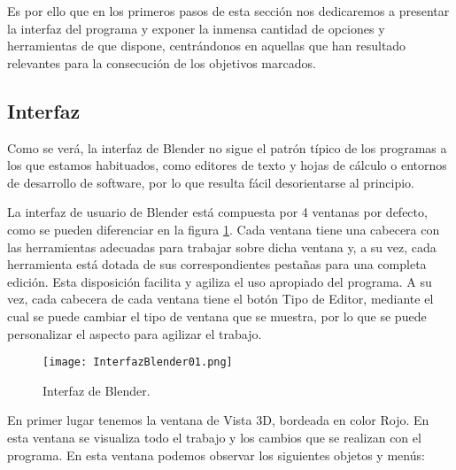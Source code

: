 Es por ello que en los primeros pasos de esta sección nos dedicaremos a presentar la interfaz del programa y exponer la inmensa cantidad de opciones y herramientas de que dispone, centrándonos en aquellas que han resultado relevantes para la consecución de los objetivos marcados.


\subsection{Interfaz}
\label{subsec:circarr_interfaz}

Como se verá, la interfaz de Blender no sigue el patrón típico de los programas a los que estamos habituados, como editores de texto y hojas de cálculo o entornos de desarrollo de software, por lo que resulta fácil desorientarse al principio.

La interfaz de usuario de Blender está compuesta por 4 ventanas por defecto, como se pueden diferenciar en la figura \ref{fig:interfazblender01}. Cada ventana tiene una cabecera con las herramientas adecuadas para trabajar sobre
dicha ventana y, a su vez, cada herramienta está dotada de sus correspondientes pestañas para una completa edición. Esta disposición facilita y agiliza el uso apropiado del programa. A su vez, cada cabecera de cada ventana tiene el botón Tipo de Editor, mediante el cual se puede cambiar el tipo de ventana que se muestra, por lo que se puede personalizar el aspecto para agilizar el trabajo.

\begin{figure}[ht]
	\centering
	\texttt{[image: InterfazBlender01.png]}
	\caption{Interfaz de Blender.} \label{fig:interfazblender01}
\end{figure}


En primer lugar tenemos la ventana de Vista 3D, bordeada en color Rojo. En esta ventana se visualiza todo el trabajo y los cambios que se realizan con el programa. En esta ventana podemos observar los siguientes objetos y menús:

